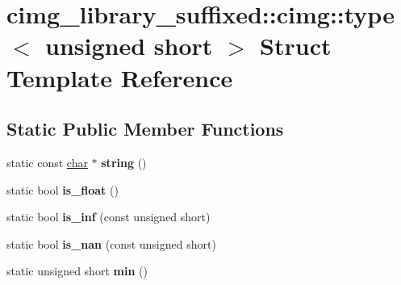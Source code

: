 \hypertarget{structcimg__library__suffixed_1_1cimg_1_1type_3_01unsigned_01short_01_4}{}\section{cimg\+\_\+library\+\_\+suffixed\+:\+:cimg\+:\+:type$<$ unsigned short $>$ Struct Template Reference}
\label{structcimg__library__suffixed_1_1cimg_1_1type_3_01unsigned_01short_01_4}
\subsection*{Static Public Member Functions}
\begin{DoxyCompactItemize}
\item 
\mbox{\label{structcimg__library__suffixed_1_1cimg_1_1type_3_01unsigned_01short_01_4_abcac34ff423e2548cc25596e8ddfc380}} 
static const \hyperlink{classchar}{char} $\ast$ {\bfseries string} ()
\item 
\mbox{\label{structcimg__library__suffixed_1_1cimg_1_1type_3_01unsigned_01short_01_4_a2097163c7f4d19b2cc20aabb06c547cd}} 
static bool {\bfseries is\+\_\+float} ()
\item 
\mbox{\label{structcimg__library__suffixed_1_1cimg_1_1type_3_01unsigned_01short_01_4_a9c4657c26875a1391ed16a98dbc5e385}} 
static bool {\bfseries is\+\_\+inf} (const unsigned short)
\item 
\mbox{\label{structcimg__library__suffixed_1_1cimg_1_1type_3_01unsigned_01short_01_4_a6754c10f18d5bf90828d7190c6accad0}} 
static bool {\bfseries is\+\_\+nan} (const unsigned short)
\item 
\mbox{\label{structcimg__library__suffixed_1_1cimg_1_1type_3_01unsigned_01short_01_4_a3367e7e0ef951b37f97df6c5cd5d3c06}} 
static unsigned short {\bfseries min} ()
\item 

\end{DoxyCompactItemize}
